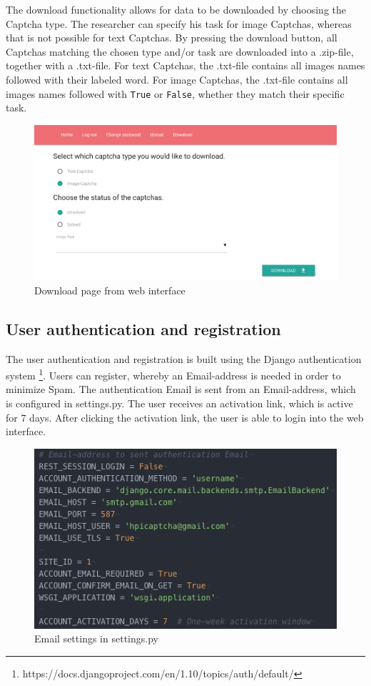 The download functionality allows for data to be downloaded by choosing the Captcha type. The researcher can specify his task for image Captchas, whereas that is not possible for text Captchas. By pressing the download button, all Captchas matching the chosen type and/or task are downloaded into a .zip-file, together with a .txt-file. For text Captchas, the .txt-file contains all images names followed with their labeled word. For image Captchas, the .txt-file contains all images names followed with \verb|True| or \verb|False|, whether they match their specific task.
\begin{figure}[H]
\centering
\includegraphics[width=1\linewidth]{content/figures/download.png}
\caption{Download page from web interface}
\label{fig:download}
\end{figure}

\subsection{User authentication and registration}

The user authentication and registration is built using the Django authentication system \footnote{https://docs.djangoproject.com/en/1.10/topics/auth/default/}. Users can register, whereby an Email-address is needed in order to minimize Spam. The authentication Email is sent from an Email-address, which is configured in settings.py.
The user receives an activation link, which is active for 7 days. After clicking the activation link, the user is able to login into the web interface.
\begin{figure}[H]
\centering
\includegraphics[width=0.8\linewidth]{content/figures/email_settings.png}
\caption{Email settings in settings.py}
\label{fig:email_settings}
\end{figure}

